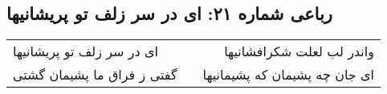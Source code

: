 \begin{center}
\section*{رباعی شماره ۲۱: ای در سر زلف تو پریشانیها}
\label{sec:0021}
\begin{longtable}{l p{0.5cm} r}
ای در سر زلف تو پریشانیها
&&
واندر لب لعلت شکرافشانیها
\\
گفتی ز فراق ما پشیمان گشتی
&&
ای جان چه پشیمان که پشیمانیها
\\
\end{longtable}
\end{center}
